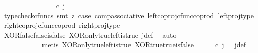 \begin{isabellebody}
\ \ \ \ \ \ \ \ \isamarkupfalse%
\ {\isachardoublequoteopen}{\isacharparenleft}{\kern0pt}{\isasymlangle}{\isasymt}{\isacharcomma}{\kern0pt}\ {\isasymt}{\isasymrangle}{\isasymamalg}\ {\isacharparenleft}{\kern0pt}{\isasymlangle}{\isasymf}{\isacharcomma}{\kern0pt}\ {\isasymf}{\isasymrangle}\ {\isasymamalg}{\isasymlangle}{\isasymf}{\isacharcomma}{\kern0pt}\ {\isasymt}{\isasymrangle}{\isacharparenright}{\kern0pt}{\isacharparenright}{\kern0pt}\ {\isasymcirc}\isactrlsub c\ j\ {\isacharequal}{\kern0pt}\ {\isasymlangle}{\isasymf}{\isacharcomma}{\kern0pt}\ {\isasymf}{\isasymrangle}{\isachardoublequoteclose}\isanewline
\ \ \ \ \ \ \ \ \ \ \isamarkupfalse%
\ {\isacharparenleft}{\kern0pt}typecheck{\isacharunderscore}{\kern0pt}cfuncs{\isacharcomma}{\kern0pt}\ smt\ {\isacharparenleft}{\kern0pt}z{}{\isacharparenright}{\kern0pt}\ case{}\ comp{\isacharunderscore}{\kern0pt}associative{}\ left{\isacharunderscore}{\kern0pt}coproj{\isacharunderscore}{\kern0pt}cfunc{\isacharunderscore}{\kern0pt}coprod\ left{\isacharunderscore}{\kern0pt}proj{\isacharunderscore}{\kern0pt}type\ right{\isacharunderscore}{\kern0pt}coproj{\isacharunderscore}{\kern0pt}cfunc{\isacharunderscore}{\kern0pt}coprod\ right{\isacharunderscore}{\kern0pt}proj{\isacharunderscore}{\kern0pt}type{\isacharparenright}{\kern0pt}\isanewline
\ \ \ \ \ \ \ \ \isamarkupfalse%
\ \isamarkupfalse%
\ {\isachardoublequoteopen}{\isasymlangle}{\isasymt}{\isacharcomma}{\kern0pt}\ {\isasymt}{\isasymrangle}\ {\isacharequal}{\kern0pt}\ {\isasymlangle}{\isasymf}{\isacharcomma}{\kern0pt}{\isasymf}{\isasymrangle}{\isachardoublequoteclose}\isanewline
\ \ \ \ \ \ \ \ \ \ \isamarkupfalse%
\ XOR{\isacharunderscore}{\kern0pt}false{\isacharunderscore}{\kern0pt}false{\isacharunderscore}{\kern0pt}is{\isacharunderscore}{\kern0pt}false\ XOR{\isacharunderscore}{\kern0pt}only{\isacharunderscore}{\kern0pt}true{\isacharunderscore}{\kern0pt}left{\isacharunderscore}{\kern0pt}is{\isacharunderscore}{\kern0pt}true\ j{\isacharunderscore}{\kern0pt}def\ \isamarkupfalse%
\ auto\isanewline
\ \ \ \ \ \ \ \ \isamarkupfalse%
\ \isamarkupfalse%
\ {\isachardoublequoteopen}{\isasymt}\ {\isacharequal}{\kern0pt}\ {\isasymf}{\isachardoublequoteclose}\isanewline
\ \ \ \ \ \ \ \ \ \ \isamarkupfalse%
\ {\isacharparenleft}{\kern0pt}metis\ XOR{\isacharunderscore}{\kern0pt}only{\isacharunderscore}{\kern0pt}true{\isacharunderscore}{\kern0pt}left{\isacharunderscore}{\kern0pt}is{\isacharunderscore}{\kern0pt}true\ XOR{\isacharunderscore}{\kern0pt}true{\isacharunderscore}{\kern0pt}true{\isacharunderscore}{\kern0pt}is{\isacharunderscore}{\kern0pt}false\ {\isacartoucheopen}{\isasymlangle}{\isasymt}{\isacharcomma}{\kern0pt}{\isasymt}{\isasymrangle}\ {\isasymamalg}\ {\isasymlangle}{\isasymf}{\isacharcomma}{\kern0pt}{\isasymf}{\isasymrangle}\ {\isasymamalg}\ {\isasymlangle}{\isasymf}{\isacharcomma}{\kern0pt}{\isasymt}{\isasymrangle}\ {\isasymcirc}\isactrlsub c\ j\ {\isacharequal}{\kern0pt}\ {\isasymlangle}{\isasymf}{\isacharcomma}{\kern0pt}{\isasymf}{\isasymrangle}{\isacartoucheclose}\ j{\isacharunderscore}{\kern0pt}def{\isacharparenright}{\kern0pt}\isanewline

\end{isabellebody}
